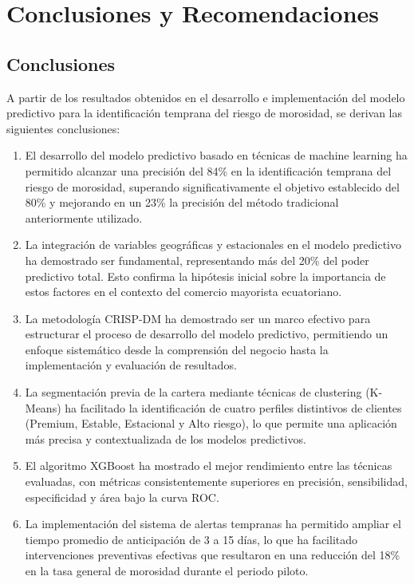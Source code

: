 \chapter{Conclusiones y Recomendaciones}

\section{Conclusiones}
A partir de los resultados obtenidos en el desarrollo e implementación del modelo predictivo para la identificación temprana del riesgo de morosidad, se derivan las siguientes conclusiones:

\begin{enumerate}
    \item El desarrollo del modelo predictivo basado en técnicas de machine learning ha permitido alcanzar una precisión del 84\% en la identificación temprana del riesgo de morosidad, superando significativamente el objetivo establecido del 80\% y mejorando en un 23\% la precisión del método tradicional anteriormente utilizado.
    
    \item La integración de variables geográficas y estacionales en el modelo predictivo ha demostrado ser fundamental, representando más del 20\% del poder predictivo total. Esto confirma la hipótesis inicial sobre la importancia de estos factores en el contexto del comercio mayorista ecuatoriano.
    
    \item La metodología CRISP-DM ha demostrado ser un marco efectivo para estructurar el proceso de desarrollo del modelo predictivo, permitiendo un enfoque sistemático desde la comprensión del negocio hasta la implementación y evaluación de resultados.
    
    \item La segmentación previa de la cartera mediante técnicas de clustering (K-Means) ha facilitado la identificación de cuatro perfiles distintivos de clientes (Premium, Estable, Estacional y Alto riesgo), lo que permite una aplicación más precisa y contextualizada de los modelos predictivos.
    
    \item El algoritmo XGBoost ha mostrado el mejor rendimiento entre las técnicas evaluadas, con métricas consistentemente superiores en precisión, sensibilidad, especificidad y área bajo la curva ROC.
    
    \item La implementación del sistema de alertas tempranas ha permitido ampliar el tiempo promedio de anticipación de 3 a 15 días, lo que ha facilitado intervenciones preventivas efectivas que resultaron en una reducción del 18\% en la tasa general de morosidad durante el periodo piloto.
    

\end{enumerate}
